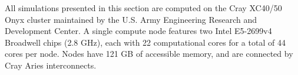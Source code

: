 All simulations presented in this section are computed on the Cray XC40/50 Onyx cluster maintained by the U.S. Army Engineering Research and Development Center. A single compute node features two Intel E5-2699v4 Broadwell chips (2.8 GHz), each with 22 computational cores for a total of 44 cores per node. Nodes have 121 GB of accessible memory, and are connected by Cray Aries interconnects.